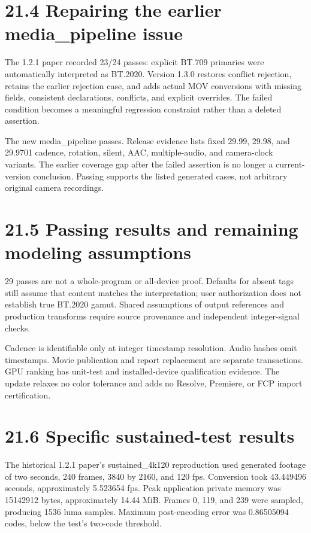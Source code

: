 \documentclass[11pt,a4paper,openany]{book}
\begin{document}
\section*{21.4 Repairing the earlier media\_pipeline issue}
The 1.2.1 paper recorded 23/24 passes: explicit BT.709 primaries were automatically interpreted as BT.2020. Version 1.3.0 restores conflict rejection, retains the earlier rejection case, and adds actual MOV conversions with missing fields, consistent declarations, conflicts, and explicit overrides. The failed condition becomes a meaningful regression constraint rather than a deleted assertion.

The new media\_pipeline passes. Release evidence lists fixed 29.99, 29.98, and 29.9701 cadence, rotation, silent, AAC, multiple-audio, and camera-clock variants. The earlier coverage gap after the failed assertion is no longer a current-version conclusion. Passing supports the listed generated cases, not arbitrary original camera recordings.


\section*{21.5 Passing results and remaining modeling assumptions}
29 passes are not a whole-program or all-device proof. Defaults for absent tags still assume that content matches the interpretation; user authorization does not establish true BT.2020 gamut. Shared assumptions of output references and production transforms require source provenance and independent integer-signal checks.

Cadence is identifiable only at integer timestamp resolution. Audio hashes omit timestamps. Movie publication and report replacement are separate transactions. GPU ranking has unit-test and installed-device qualification evidence. The update relaxes no color tolerance and adds no Resolve, Premiere, or FCP import certification.


\section*{21.6 Specific sustained-test results}
The historical 1.2.1 paper's sustained\_4k120 reproduction used generated footage of two seconds, 240 frames, 3840 by 2160, and 120 fps. Conversion took 43.449496 seconds, approximately 5.523654 fps. Peak application private memory was 15142912 bytes, approximately 14.44 MiB. Frames 0, 119, and 239 were sampled, producing 1536 luma samples. Maximum post-encoding error was 0.86505094 codes, below the test's two-code threshold.
\end{document}
